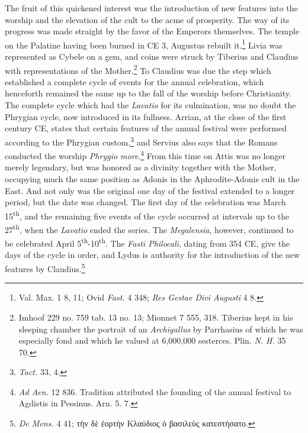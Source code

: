 \documentclass[a4paper, 11pt, oneside, polutonikogreek, english]{article}
\begin{document}
The fruit of this quickened interest was the introduction of new features into the worship and the elevation of the cult to the acme of prosperity. The way of its progress was made straight by the favor of the Emperors themselves. The temple on the Palatine having been burned in \textsc{CE} 3, Augustus rebuilt it.\footnote{Val. Max. 1 8, 11; Ovid \emph{Fast.} 4 348; \emph{Res Gestae Divi Augusti} 4 8.} Livia was represented as Cybele on a gem, and coins were struck by Tiberius and Claudius with representations of the Mother.\footnote{Imhoof 229 no. 759 tab. 13 no. 13; Mionnet 7 555, 318. Tiberius kept in his sleeping chamber the portrait of an \emph{Archigallus} by Parrhasius of which he was especially fond and which he valued at 6,000,000 sesterces. Plin. \emph{N. H.} 35 70.} To Claudius was due the step which established a complete cycle of events for the annual celebration, which henceforth remained the same up to the fall of the worship before Christianity. The complete cycle which had the \emph{Lavatio} for its culmination, was no doubt the Phrygian cycle, now introduced in its fullness. Arrian, at the close of the first century \textsc{CE}, states that certain features of the annual festival were performed according to the Phrygian custom,\footnote{\emph{Tact.} 33, 4.} and Servius also says that the Romans conducted the worship \emph{Phrygio more}.\footnote{\emph{Ad Aen.} 12 836. Tradition attributed the founding of the annual festival to Agdistis in Pessinus. Arn. 5. 7.} From this time on Attis was no longer merely legendary, but was honored as a divinity together with the Mother, occupying much the same position as Adonis in the Aphrodite-Adonis cult in the East. And not only was the original one day of the festival extended to a longer period, but the date was changed. The first day of the celebration was March 15\textsuperscript{th}, and the remaining five events of the cycle occurred at intervals up to the 27\textsuperscript{th}, when the \emph{Lavatio} ended the series. The \emph{Megalensia}, however, continued to be celebrated April 5\textsuperscript{th}-10\textsuperscript{th}. The \emph{Fasti Philocali}, dating from 354 \textsc{CE}, give the days of the cycle in order, and Lydus is authority for the introduction of the new features by Claudius.\footnote{\emph{De Mens.} 4 41; τὴν δὲ ἑορτὴν Κλαύδιος ὁ βασιλεὺς κατεστήσατο.}
\end{document}
